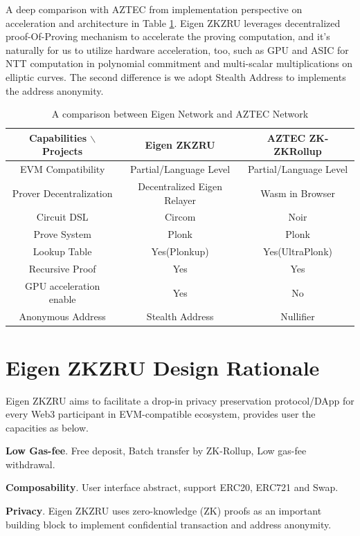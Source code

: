 \documentclass{article}
\begin{document}
A deep comparison with AZTEC from implementation perspective on acceleration and architecture in Table \ref{tab:widgets2}. Eigen ZKZRU leverages decentralized proof-Of-Proving mechanism to accelerate the proving computation, and it's naturally for us to utilize hardware acceleration, too, such as GPU and ASIC for NTT computation in polynomial commitment and multi-scalar multiplications on elliptic curves. The second difference is we adopt Stealth Address to implements the address anonymity.

\begin{table}
\centering
\begin{tabular}{c|c|c}
Capabilities $\backslash$ Projects & Eigen ZKZRU & AZTEC ZK-ZKRollup \\\hline
EVM Compatibility & Partial/Language Level & Partial/Language Level \\

Prover Decentralization & \color{red} Decentralized Eigen Relayer & Wasm in Browser \\
Circuit DSL & Circom & Noir \\
Prove System & Plonk & Plonk \\
Lookup Table & Yes(Plonkup) & Yes(UltraPlonk) \\
Recursive Proof & Yes & Yes \\
GPU acceleration enable & \color{red} Yes & No \\
Anonymous Address & \color{red} Stealth Address & Nullifier \\

\end{tabular}
\caption{\label{tab:widgets2} A comparison between Eigen Network and AZTEC Network}
\end{table}


\section{Eigen ZKZRU Design Rationale}

Eigen ZKZRU aims to facilitate a drop-in privacy preservation protocol/DApp for every Web3 participant in EVM-compatible ecosystem, provides user the capacities as below.

\noindent\textbf{Low Gas-fee}. Free deposit, Batch transfer by ZK-Rollup, Low gas-fee withdrawal.

\noindent\textbf{Composability}. User interface abstract,  support ERC20, ERC721 and Swap.

\noindent\textbf{Privacy}. Eigen ZKZRU uses zero-knowledge (ZK) proofs as an important building block to implement confidential transaction and address anonymity.  
\end{document}

